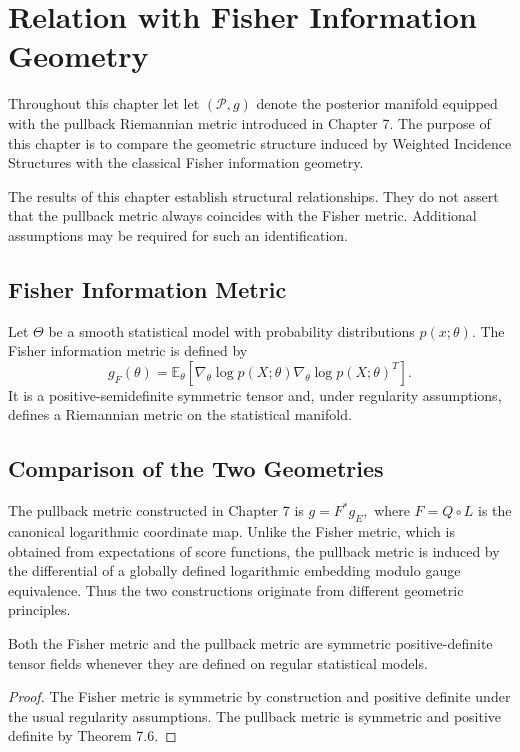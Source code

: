 \chapter[Fisher Information Geometry]{Relation with Fisher Information Geometry}
Throughout this chapter let let $(\mathcal P,g)$ denote the posterior manifold equipped with the pullback Riemannian metric introduced in Chapter 7.
The purpose of this chapter is to compare the geometric structure
induced by Weighted Incidence Structures with the classical Fisher
information geometry.
\begin{remark}
The results of this chapter establish structural
relationships. They do not assert that the pullback metric always
coincides with the Fisher metric. Additional assumptions may be
required for such an identification.
\end{remark}
\section{Fisher Information Metric}
Let $\Theta$ be a smooth statistical model with probability distributions
$p(x;\theta).$
The Fisher information metric is defined by
\[
g_F(\theta)
=
\mathbb E_\theta
\!\left[
\nabla_\theta\log p(X;\theta)
\nabla_\theta\log p(X;\theta)^T
\right].
\]
It is a positive-semidefinite symmetric tensor and, under regularity
assumptions, defines a Riemannian metric on the statistical manifold.
\section{Comparison of the Two Geometries}
The pullback metric constructed in Chapter 7 is
$g = F^{*}g_E,$
where
$F = Q\circ L$
is the canonical logarithmic coordinate map.
Unlike the Fisher metric, which is obtained from expectations of score
functions, the pullback metric is induced by the differential of a
globally defined logarithmic embedding modulo gauge equivalence.
Thus the two constructions originate from different geometric
principles.
\begin{proposition}
\label{ch:prop:10-1}
Both the Fisher metric and the pullback metric are symmetric
positive-definite tensor fields whenever they are defined on regular
statistical models.
\end{proposition}
\begin{proof}
The Fisher metric is symmetric by construction and positive definite
under the usual regularity assumptions.
The pullback metric is symmetric and positive definite by Theorem 7.6.
\end{proof}

